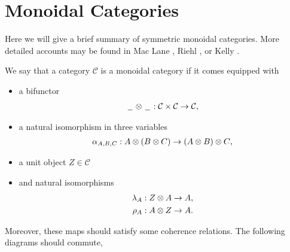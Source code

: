 \documentclass[../thesis.tex]{subfiles}
\begin{document}
    \section{Monoidal Categories}

        Here we will give a brief summary of symmetric monoidal categories. More detailed accounts may be found in Mac Lane \cite{MacLane71}, Riehl \cite{Riehl14}, or Kelly \cite{Kelly05}. 

        \begin{definition}
            
            We say that a category $\mathcal{C}$ is a monoidal category if it comes equipped with 
            \begin{itemize}
                \item a bifunctor
                \begin{align*}
                    \argument \otimes \argument : \mathcal{C} \times \mathcal{C} \rightarrow \mathcal{C}\tt{,}
                \end{align*}
                \item a natural isomorphism in three variables
                \begin{align*}
                    \alpha_{A,B,C} : A \otimes (B \otimes C) \rightarrow (A \otimes B) \otimes C\tt{,}
                \end{align*}
                \item a unit object $Z \in \mathcal{C}$
                \item and natural isomorphisms
                \begin{align*}
                    \lambda_A & : Z \otimes A \rightarrow A\tt{,} \\
                    \rho_A & : A \otimes Z \rightarrow A\tt{.}
                \end{align*}
            \end{itemize}
            Moreover, these maps should satisfy some coherence relations. The following diagrams should commute,
            \begin{center}
\end{center}
\end{definition}
\end{document}
